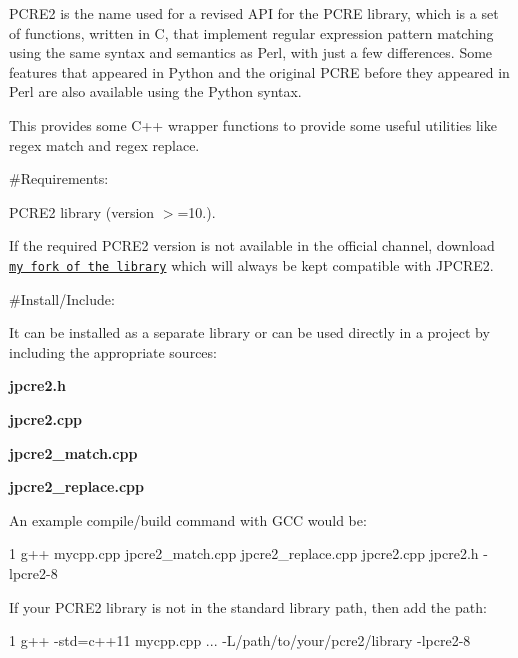 \href{https://travis-ci.org/jpcre2/jpcre2/}{\tt }

 P\+C\+R\+E2 is the name used for a revised A\+PI for the P\+C\+RE library, which is a set of functions, written in C, that implement regular expression pattern matching using the same syntax and semantics as Perl, with just a few differences. Some features that appeared in Python and the original P\+C\+RE before they appeared in Perl are also available using the Python syntax.

This provides some C++ wrapper functions to provide some useful utilities like regex match and regex replace.

 \#\+Requirements\+:


\begin{DoxyEnumerate}
\item P\+C\+R\+E2 library ({\ttfamily version $>$=10.}).
\end{DoxyEnumerate}

If the required P\+C\+R\+E2 version is not available in the official channel, download \href{https://github.com/jpcre2/pcre2}{\tt my fork of the library} which will always be kept compatible with J\+P\+C\+R\+E2.

 \#\+Install/\+Include\+:

It can be installed as a separate library or can be used directly in a project by including the appropriate sources\+:


\begin{DoxyEnumerate}
\item {\bfseries jpcre2.\+h}
\item {\bfseries jpcre2.\+cpp}
\item {\bfseries jpcre2\+\_\+match.\+cpp}
\item {\bfseries jpcre2\+\_\+replace.\+cpp}
\end{DoxyEnumerate}

An example compile/build command with G\+CC would be\+:


\begin{DoxyCode}
1 g++ mycpp.cpp jpcre2\_match.cpp jpcre2\_replace.cpp jpcre2.cpp jpcre2.h -lpcre2-8
\end{DoxyCode}


If your P\+C\+R\+E2 library is not in the standard library path, then add the path\+:


\begin{DoxyCode}
1 g++ -std=c++11 mycpp.cpp ... -L/path/to/your/pcre2/library -lpcre2-8
\end{DoxyCode}


